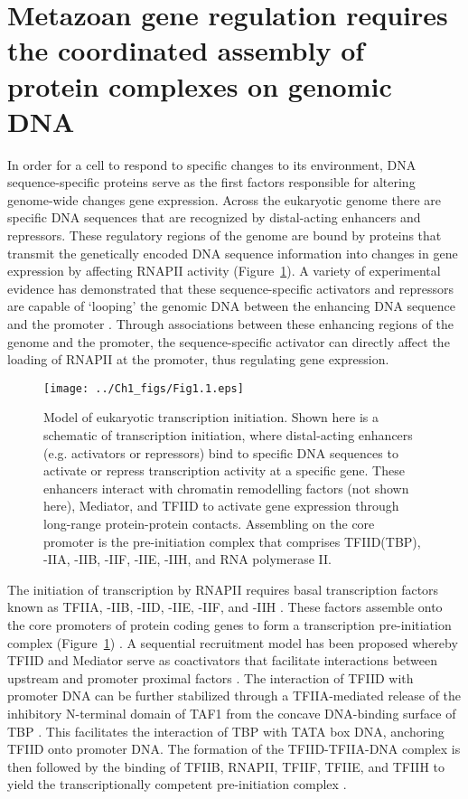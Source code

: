 \section{Metazoan gene regulation requires the coordinated assembly of protein complexes on genomic DNA}

In order for a cell to respond to specific changes to its environment, DNA sequence-specific proteins serve as the first factors responsible for altering genome-wide changes gene expression. Across the eukaryotic genome there are specific DNA sequences that are recognized by distal-acting enhancers and repressors. These regulatory regions of the genome are bound by proteins that transmit the genetically encoded DNA sequence information into changes in gene expression by affecting RNAPII activity (Figure~\ref{fig:Fig1.1}). A variety of experimental evidence has demonstrated that these sequence-specific activators and repressors are capable of ‘looping’ the genomic DNA between the enhancing DNA sequence and the promoter \cite{d_41}. Through associations between these enhancing regions of the genome and the promoter, the sequence-specific activator can directly affect the loading of RNAPII at the promoter, thus regulating gene expression.\\ 
\begin{figure}
\centering
\texttt{[image: ../Ch1\_figs/Fig1.1.eps]}
\caption[Model of eukaryotic transcription initiation]{Model of eukaryotic transcription initiation.  Shown here is a schematic of transcription initiation, where distal-acting enhancers (e.g. activators or repressors) bind to specific DNA sequences to activate or repress transcription activity at a specific gene.  These enhancers interact with chromatin remodelling factors (not shown here), Mediator, and TFIID to activate gene expression through long-range protein-protein contacts.  Assembling on the core promoter is the pre-initiation complex that comprises TFIID(TBP), -IIA, -IIB, -IIF, -IIE, -IIH, and RNA polymerase II.}
\label{fig:Fig1.1}
\end{figure}
\indent The initiation of transcription by RNAPII requires basal transcription factors known as TFIIA, -IIB, -IID, -IIE, -IIF, and -IIH \cite{Thomas_1201}. These factors assemble onto the core promoters of protein coding genes to form a transcription pre-initiation complex (Figure~\ref{fig:Fig1.1}) \cite{Buratowski_3748,Rhee_24}. A sequential recruitment model has been proposed whereby TFIID and Mediator serve as coactivators that facilitate interactions between upstream and promoter proximal factors \cite{Burley_3049}. The interaction of TFIID with promoter DNA can be further stabilized through a TFIIA-mediated release of the inhibitory N-terminal domain of TAF1 from the concave DNA-binding surface of TBP \cite{Bagby_2202,Geiger_2949,Liu_2574}. This facilitates the interaction of TBP with TATA box DNA, anchoring TFIID onto promoter DNA. The formation of the TFIID-TFIIA-DNA complex is then followed by the binding of TFIIB, RNAPII, TFIIF, TFIIE, and TFIIH to yield the transcriptionally competent pre-initiation complex \cite{Thomas_1201}.\\ 
